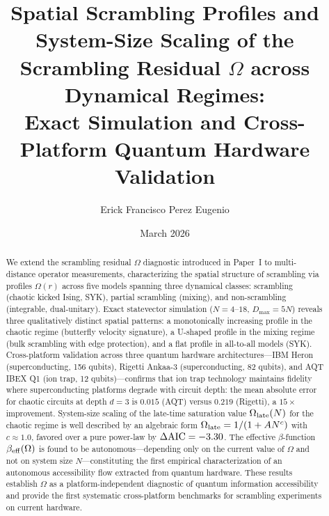 \documentclass[twocolumn,showpacs,preprintnumbers,amsmath,amssymb,aps,prl]{revtex4-2}
\begin{document}
\title{Spatial Scrambling Profiles and System-Size Scaling of the\\
Scrambling Residual $\Omega$ across Dynamical Regimes:\\
Exact Simulation and Cross-Platform Quantum Hardware Validation}

\author{Erick Francisco Perez Eugenio}

\date{March 2026}

\begin{abstract}
We extend the scrambling residual $\Omega$ diagnostic introduced in Paper~I to
multi-distance operator measurements, characterizing the spatial structure of
scrambling via profiles $\Omega(r)$ across five models spanning three dynamical
classes: scrambling (chaotic kicked Ising, SYK), partial scrambling (mixing), and
non-scrambling (integrable, dual-unitary). Exact statevector simulation
($N = 4$--$18$, $D_{\max} = 5N$) reveals three qualitatively distinct spatial
patterns: a monotonically increasing profile in the chaotic regime (butterfly
velocity signature), a U-shaped profile in the mixing regime (bulk scrambling with
edge protection), and a flat profile in all-to-all models (SYK). Cross-platform
validation across three quantum hardware architectures---IBM Heron (superconducting,
156 qubits), Rigetti Ankaa-3 (superconducting, 82 qubits), and AQT IBEX Q1
(ion trap, 12 qubits)---confirms that ion trap technology maintains fidelity where
superconducting platforms degrade with circuit depth: the mean absolute error for
chaotic circuits at depth $d=3$ is $0.015$ (AQT) versus $0.219$ (Rigetti), a
$15\times$ improvement. System-size scaling of the late-time saturation value
$\Omega_{\rm late}(N)$ for the chaotic regime is well described by an algebraic
form $\Omega_{\rm late} = 1/(1+AN^c)$ with $c \approx 1.0$, favored over a pure
power-law by $\Delta{\rm AIC} = -3.30$. The effective $\beta$-function $\beta_{\rm eff}(\Omega)$ is found to be autonomous---depending only on the current value of $\Omega$ and not on system size $N$---constituting the first empirical characterization of an autonomous accessibility flow extracted from quantum hardware. These results establish $\Omega$ as a
platform-independent diagnostic of quantum information accessibility and provide
the first systematic cross-platform benchmarks for scrambling experiments on current
hardware.
\end{abstract}
\end{document}
